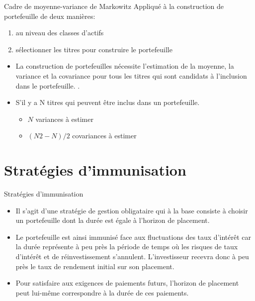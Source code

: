\documentclass[10pt,a4paper]{beamer}
\begin{document}
\begin{frame}{Cadre de moyenne-variance de Markowitz}
Appliqué à la construction de portefeuille de deux manières:
\begin{enumerate}[label=\arabic*)]
\item au niveau des classes d'actifs
\item sélectionner les titres pour construire le portefeuille
\end{enumerate}

\begin{itemize}[label=\bullet]
\item La construction de portefeuilles nécessite l'estimation de la moyenne,  la variance et la covariance pour tous les titres qui sont candidats à l'inclusion dans le portefeuille. .
\item S'il y a N titres qui peuvent être inclus dans un portefeuille.
\begin{itemize}[label=*]
\item $N$ variances à estimer 
\item $(N2 - N) / 2$ covariances à estimer
\end{itemize}
\end{itemize}
\end{frame}

\section{Stratégies d’immunisation}
\begin{frame}{Stratégies d’immunisation}
\begin{itemize}[label=\bullet]
\item Il s’agit d’une stratégie de gestion obligataire qui à la base consiste à choisir un portefeuille dont la durée est égale à l’horizon de placement.
\item Le portefeuille est ainsi immunisé face aux fluctuations des taux d’intérêt car la durée représente à peu près la période de temps où les risques de taux d’intérêt et de réinvestissement s’annulent. L’investisseur recevra donc à peu près le taux de rendement initial sur son placement.  
\item Pour satisfaire aux exigences de paiements futurs, l’horizon de placement peut lui-même correspondre à la durée de ces paiements.  
\end{itemize}
\end{frame}
\end{document}
